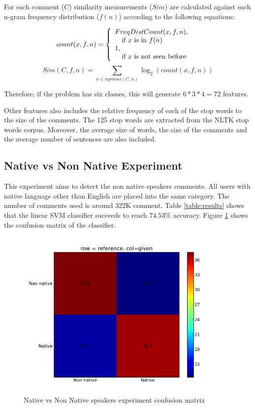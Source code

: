 \documentclass[11pt]{article}
\begin{document}
For each comment ($C$) similarity measurements ($Sim$) are calculated against each n-gram frequency distribution ($f(n)$) according to the following equations:

\[
  count(x, f, n) = \left\{ 
  \begin{array}{l l}
    FreqDistCount(x, f, n), & \\\quad \text{if $x$ is in $f(n)$}\\
    1,&\\\quad \text{if $x$ is not seen before}\\
  \end{array} \right.
\]
\[
  Sim(C,f,n) = \sum_{x \in ngrams(C,n)} \log_2 (count(x,f,n))
\]

Therefore, if the problem has six classes, this will generate $6*3*4 = 72$ features.

Other features also includes the relative frequency of each of the stop words to the size of the comments. The 125 stop words are extracted from the NLTK stop words corpus. Moreover, the average size of words, the size of the comments and the average number of sentences are also included.


\subsection{Native vs Non Native Experiment}
This experiment aims to detect the non native speakers comments. All users with native language other than English are placed into the same category. The number of comments used is around 322K comment. Table \ref{table:results} shows that the linear SVM classifier succeeds to reach $74.53\%$ accuracy. Figure \ref{non_cfm} shows the confusion matrix of the classifier.


\begin{figure}[htp]
\centering
\includegraphics[scale=0.45]{native_cfm.png}
\caption{Native vs Non Native speakers experiment confusion matrix}
\label{non_cfm}
\end{figure}
\end{document}
